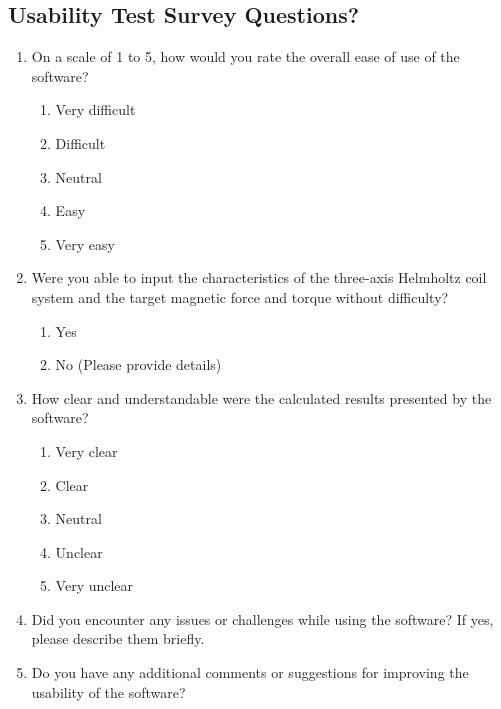 \documentclass[12pt, titlepage]{article}
\begin{document}
\subsection{Usability Test Survey Questions?}\label{subsec:UsabilitySurvery}
\begin{enumerate}
    \item On a scale of 1 to 5, how would you rate the overall ease of use of the software?
    \begin{enumerate}
        \item Very difficult
        \item Difficult
        \item Neutral
        \item Easy
        \item Very easy
    \end{enumerate}

    \item Were you able to input the characteristics of the three-axis Helmholtz coil system and the target magnetic force and torque without difficulty?
    \begin{enumerate}
        \item Yes
        \item No (Please provide details)
    \end{enumerate}

    \item How clear and understandable were the calculated results presented by the software?
    \begin{enumerate}
        \item Very clear
        \item Clear
        \item Neutral
        \item Unclear
        \item Very unclear
    \end{enumerate}

    \item Did you encounter any issues or challenges while using the software? If yes, please describe them briefly.
    \item Do you have any additional comments or suggestions for improving the usability of the software?

\end{enumerate}
\end{document}
